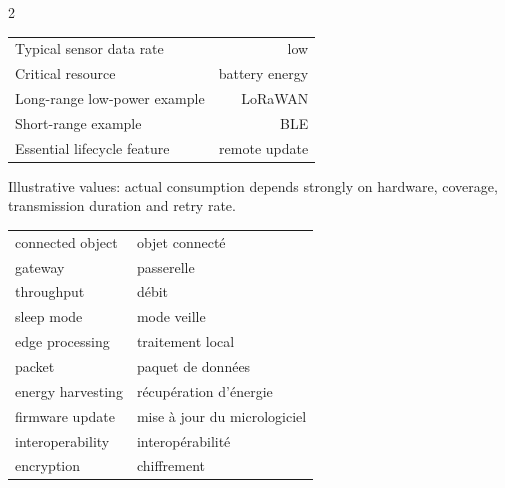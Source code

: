 \begin{multicols}{2}
\begin{keyfigures}
\begin{tabularx}{\linewidth}{@{}Xr@{}}
Typical sensor data rate & low\\
Critical resource & battery energy\\
Long-range low-power example & LoRaWAN\\
Short-range example & BLE\\
Essential lifecycle feature & remote update
\end{tabularx}
\end{keyfigures}

\begin{tcolorbox}[title=\sffamily\bfseries Relative communication current,colback=white,colframe=ECGreen]
\begin{center}
\end{center}
\footnotesize Illustrative values: actual consumption depends strongly on hardware, coverage,
transmission duration and retry rate.
\end{tcolorbox}

\begin{vocabulary}
\begin{tabularx}{\linewidth}{@{}lX@{}}
connected object & objet connecté\\
gateway & passerelle\\
throughput & débit\\
sleep mode & mode veille\\
edge processing & traitement local\\
packet & paquet de données\\
energy harvesting & récupération d'énergie\\
firmware update & mise à jour du micrologiciel\\
interoperability & interopérabilité\\
encryption & chiffrement
\end{tabularx}
\end{vocabulary}


\end{multicols}
